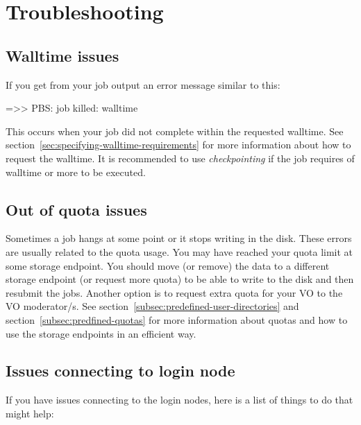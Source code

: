 \chapter{Troubleshooting}
\label{ch:troubleshooting}



\section{Walltime issues}
If you get from your job output an error message similar to this:

\begin{prompt}
 =>> PBS: job killed: walltime %
\end{prompt}

This occurs when your job did not complete within the requested walltime.
See section~\ref{sec:specifying-walltime-requirements} for more information about how to request the walltime.
It is recommended to use \emph{checkpointing} if the job requires  of walltime or more to be executed.



\section{Out of quota issues}

Sometimes a job hangs at some point or it stops writing in the disk. These errors are usually
related to the quota usage. You may have reached your quota limit at some storage endpoint.
You should move (or remove) the data to a different storage endpoint (or request more quota) to be able to write to the disk and then resubmit the jobs.
\ifgent
Another option is to request extra quota for your VO to the VO moderator/s.
See section~\ref{subsec:predefined-user-directories} and section~\ref{subsec:predfined-quotas} for more information about
quotas and how to use the storage endpoints in an efficient way.
\fi

\section{Issues connecting to login node}
\label{sec:connecting-issues}

If you have issues connecting to the login nodes, here is a list of things to do
that might help:


